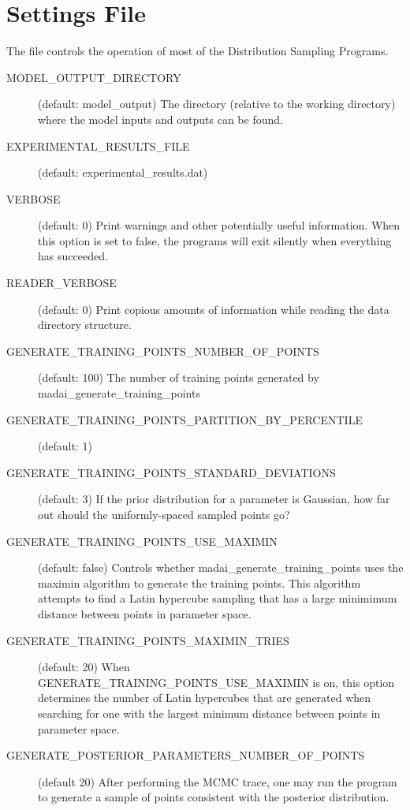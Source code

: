 
\section{Settings File}\label{sec:settings}

The file  controls the operation of most of the
Distribution Sampling Programs.

\begin{description}
    \item[MODEL\_OUTPUT\_DIRECTORY] (default: model\_output) The directory (relative to the working directory) where the model inputs and outputs can be found.
    \item[EXPERIMENTAL\_RESULTS\_FILE] (default: experimental\_results.dat)
    \item[VERBOSE] (default: 0) Print warnings and other potentially useful information. When this option is set to false, the programs will exit silently when everything has succeeded.
    \item[READER\_VERBOSE] (default: 0) Print copious amounts of information while reading the data directory structure.
    \item[GENERATE\_TRAINING\_POINTS\_NUMBER\_OF\_POINTS] (default: 100) The number of training points generated by madai\_generate\_training\_points
    \item[GENERATE\_TRAINING\_POINTS\_PARTITION\_BY\_PERCENTILE] (default: 1)
    \item[GENERATE\_TRAINING\_POINTS\_STANDARD\_DEVIATIONS] (default: 3) If the prior distribution for a parameter is Gaussian, how far out should the uniformly-spaced sampled points go?
    \item[GENERATE\_TRAINING\_POINTS\_USE\_MAXIMIN] (default: false) Controls whether madai\_generate\_training\_points uses the maximin algorithm to generate the training points. This algorithm attempts to find a Latin hypercube sampling that has a large minimimum distance between points in parameter space.
    \item[GENERATE\_TRAINING\_POINTS\_MAXIMIN\_TRIES] (default: 20) When GENERATE\_TRAINING\_POINTS\_USE\_MAXIMIN is on, this option determines the number of Latin hypercubes that are generated when searching for one with the largest minimum distance between points in parameter space.
    \item[GENERATE\_POSTERIOR\_PARAMETERS\_NUMBER\_OF\_POINTS] (default 20) After performing the MCMC trace, one may run the program  to generate a sample of points consistent with the posterior distribution.

\end{description}
